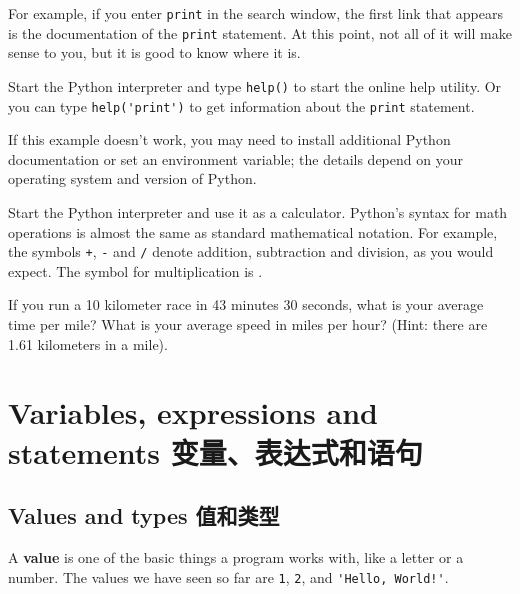 \documentclass[10pt]{book}
\begin{document}
\begin{CJK}{UTF8}{gbsn}
\begin{exercise}
For example, if you enter {\tt print} in the search window, the
first link that appears is the documentation of the {\tt print}
statement.  At this point, not all of it will make sense to you,
but it is good to know where it is.

\end{exercise}

\begin{exercise}

Start the Python interpreter and type {\tt help()} to start the online
help utility.  Or you can type \verb"help('print')" to get information
about the {\tt print} statement.

If this example doesn't work, you
may need to install additional Python documentation or set an
environment variable; the details depend on your operating system and
version of Python.

\end{exercise}

\begin{exercise}

Start the Python interpreter and use it as a calculator.
Python's syntax for math operations is almost the same as
standard mathematical notation.  For example, the symbols
{\tt +}, {\tt -} and {\tt /} denote addition, subtraction
and division, as you would expect.  The symbol for
multiplication is {\tt *}.

If you run a 10 kilometer race in 43 minutes 30 seconds, what is your
average time per mile?  What is your average speed in miles per hour?
(Hint: there are 1.61 kilometers in a mile).

\end{exercise}




\chapter{Variables, expressions and statements 变量、表达式和语句}

\section{Values and types 值和类型}

A {\bf value} is one of the basic things a program works with,
like a letter or a
number.  The values we have seen so far
are {\tt 1}, {\tt 2}, and
\verb"'Hello, World!'".


\end{CJK}
\end{document}
